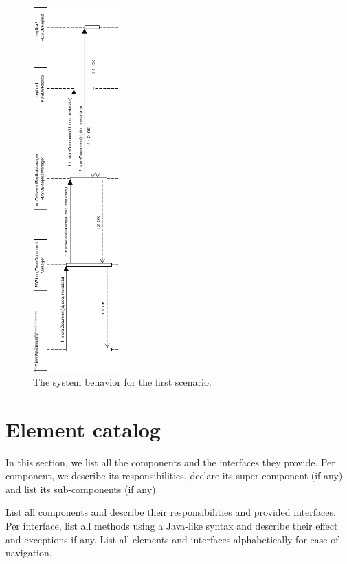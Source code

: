 \documentclass[a4paper,10pt]{article}
\begin{document}
\begin{figure}[!htp]
    \centering
    \includegraphics[width=0.3\textwidth]{Seq_StoreDocPDS.png}
    \caption{The system behavior for the first scenario.
        }\label{fig:seq_StoreDocPDS}
\end{figure}

\FloatBarrier

\appendix
\section{Element catalog}\label{app:catalog}
In this section, we list all the components and the interfaces they provide. Per component, we describe its responsibilities, declare its super-component (if any) and list its sub-components (if any).



List all components and describe their responsibilities and provided
interfaces.
Per interface, list all methods using a Java-like syntax and describe their
effect and exceptions if any.
List all elements and interfaces alphabetically for ease of navigation.
\end{document}
